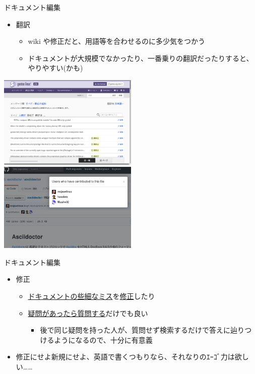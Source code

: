 \documentclass[
        unicode%
    ]{beamer}
\begin{document}
\begin{frame}{ドキュメント編集}
    \begin{itemize}
        \item 翻訳
            \begin{itemize}
                \item wiki や修正だと、用語等を合わせるのに多少気をつかう
                \item ドキュメントが大規模でなかったり、一番乗りの翻訳だったりすると、やりやすい(かも)
            \end{itemize}
    \end{itemize}
    \includegraphics[width=0.5\textwidth]{images/gentoo-wiki-translation-tool.png}
    \includegraphics[width=0.5\textwidth]{images/asciidoctor-mizuho32.png}
\end{frame}

\begin{frame}{ドキュメント編集}
    \begin{itemize}
        \item 修正
            \begin{itemize}
                \item
                    \href{https://github.com/rust-lang-nursery/rust-clippy/issues/1232}{ドキュメントの些細なミス}を\href{https://github.com/rust-lang-nursery/rust-clippy/pull/1233}{修正}したり
                \item \href{https://github.com/ivanceras/rustorm/issues/31}{疑問があったら質問する}だけでも良い
                    \begin{itemize}
                        \item 後で同じ疑問を持った人が、質問せず検索するだけで答えに辿りつけるようになるので、十分に有意義
                    \end{itemize}
            \end{itemize}
        \pause
        \item 修正にせよ新規にせよ、英語で書くつもりなら、それなりのｴｰｺﾞ力は欲しい……
    \end{itemize}
\end{frame}
\end{document}

